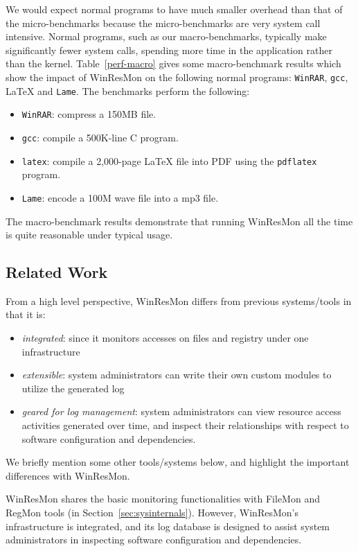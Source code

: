 We would expect normal programs to have much smaller overhead than that of the
micro-benchmarks because the micro-benchmarks are very system call intensive.
Normal programs, such as our macro-benchmarks, typically make significantly
fewer system calls, spending more time in the application rather than the
kernel.
Table~\ref{perf-macro} gives some macro-benchmark results which show the
impact of WinResMon on the following normal programs: {\small\tt WinRAR}, {\small\tt gcc}, \LaTeX{} and {\small\tt Lame}.
The benchmarks perform the following:
\begin{itemize}
\item {\small\tt WinRAR}: compress a 150MB file.  
\item {\small\tt gcc}: compile a 500K-line C program.  
\item {\small\tt latex}: compile a 2,000-page \LaTeX{} file into PDF using the
{\small\tt pdflatex} program.
\item {\small\tt Lame}: encode a 100M wave file into a mp3 file. 
\end{itemize}
The macro-benchmark results demonstrate that running WinResMon all the 
time  is quite reasonable under typical usage.


\subsection{Related Work}

 From a high level perspective, WinResMon differs from previous systems/tools in
that it is:

\begin{itemize}
\item {\em integrated}: since it monitors accesses on files and registry
under one infrastructure
\item {\em extensible}: system administrators can write their own custom
modules to utilize the generated log
\item {\em geared for log management}: system administrators can view
resource access activities generated over time, and inspect their relationships
with respect to software configuration and dependencies.
\end{itemize}

We briefly mention some other tools/systems below, and highlight the important
differences with WinResMon.

WinResMon shares the basic monitoring functionalities with
FileMon and RegMon tools (in Section~\ref{sec:sysinternals}).
However, WinResMon's
infrastructure is integrated, and its log database is designed to assist
system administrators in inspecting software configuration and dependencies.

